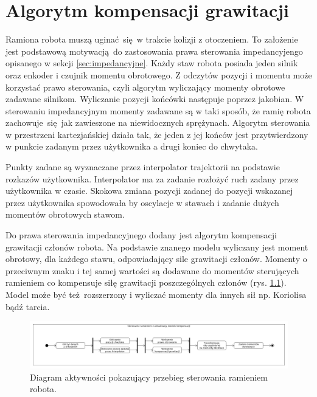 
\chapter{Algorytm kompensacji grawitacji\label{chap:implementacja_systemu}}
Ramiona robota muszą uginać się w trakcie kolizji z otoczeniem. To założenie jest podstawową motywacją do zastosowania prawa sterowania impedancyjengo opisanego w sekcji \ref{sec:impedancyjne}. Każdy staw robota posiada jeden silnik oraz enkoder i czujnik momentu obrotowego. Z odczytów pozycji i momentu może korzystać prawo sterowania, czyli algorytm wyliczający momenty obrotowe zadawane silnikom. Wyliczanie pozycji końcówki następuje poprzez jakobian. W sterowaniu impedancyjnym momenty zadawane są w taki sposób, że ramię robota zachowuje się jak zawieszone na niewidocznych sprężynach. Algorytm sterowania w przestrzeni kartezjańskiej działa tak, że jeden z jej końców jest przytwierdzony w punkcie zadanym przez użytkownika a drugi koniec do chwytaka. 

Punkty zadane są wyznaczane przez interpolator trajektorii na podstawie rozkazów użytkownika. Interpolator ma za zadanie rozłożyć ruch zadany przez użytkownika w czasie. Skokowa zmiana pozycji zadanej do pozycji wskazanej przez użytkownika spowodowała by oscylacje w stawach i zadanie dużych momentów obrotowych stawom.

Do prawa sterowania impedancyjnego dodany jest algorytm kompensacji grawitacji członów robota. Na podstawie znanego modelu wyliczany jest moment obrotowy, dla każdego stawu, odpowiadający sile grawitacji członów. Momenty o przeciwnym znaku i tej samej wartości są dodawane do momentów sterujących ramieniem co kompensuje siłę grawitacji poszczególnych członów (rys. \ref{fig:sterowanie}). Model może być też rozszerzony i wyliczać momenty dla innych sił np. Koriolisa bądź tarcia.

\begin{figure}
	\centering
	\includegraphics[width=.99\textwidth]{images/kompensacja.png}
	\caption{Diagram aktywności pokazujący przebieg sterowania ramieniem robota.}
	\label{fig:sterowanie}
\end{figure}

